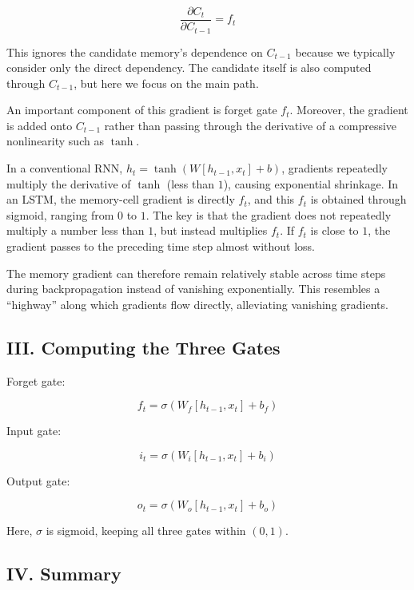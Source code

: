 \[
\frac{\partial C_t}{\partial C_{t-1}} = f_t
\]

This ignores the candidate memory's dependence on \(C_{t-1}\) because we typically consider only the direct dependency. The candidate itself is also computed through \(C_{t-1}\), but here we focus on the main path.

An important component of this gradient is forget gate \(f_t\). Moreover, the gradient is added onto \(C_{t-1}\) rather than passing through the derivative of a compressive nonlinearity such as \(\tanh\).

In a conventional RNN, \(h_t = \tanh(W [h_{t-1}, x_t] + b)\), gradients repeatedly multiply the derivative of \(\tanh\) (less than \(1\)), causing exponential shrinkage. In an LSTM, the memory-cell gradient is directly \(f_t\), and this \(f_t\) is obtained through sigmoid, ranging from \(0\) to \(1\). The key is that the gradient does not repeatedly multiply a number less than \(1\), but instead multiplies \(f_t\). If \(f_t\) is close to \(1\), the gradient passes to the preceding time step almost without loss.

The memory gradient can therefore remain relatively stable across time steps during backpropagation instead of vanishing exponentially. This resembles a ``highway'' along which gradients flow directly, alleviating vanishing gradients.

\hypertarget{iii.-computing-the-three-gates}{%
\subsection{III. Computing the Three Gates}\label{iii.-computing-the-three-gates}}

Forget gate:

\[
f_t = \sigma(W_f [h_{t-1}, x_t] + b_f)
\]

Input gate:

\[
i_t = \sigma(W_i [h_{t-1}, x_t] + b_i)
\]

Output gate:

\[
o_t = \sigma(W_o [h_{t-1}, x_t] + b_o)
\]

Here, \(\sigma\) is sigmoid, keeping all three gates within \((0,1)\).

\hypertarget{iv.-summary}{%
\subsection{IV. Summary}\label{iv.-summary}}

